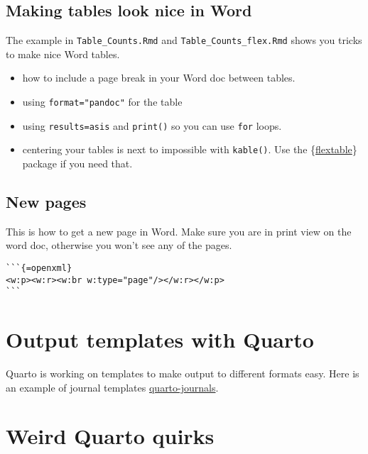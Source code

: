 \documentclass[
  letterpaper,
  oneside]{scrbook}
\providecommand{\tightlist}{%
  \setlength{\itemsep}{0pt}\setlength{\parskip}{0pt}}\usepackage{longtable,booktabs,array}
\begin{document}
\hypertarget{making-tables-look-nice-in-word}{%
\subsection{Making tables look nice in
Word}\label{making-tables-look-nice-in-word}}

The example in \texttt{Table\_Counts.Rmd} and
\texttt{Table\_Counts\_flex.Rmd} shows you tricks to make nice Word
tables.

\begin{itemize}
\tightlist
\item
  how to include a page break in your Word doc between tables.
\item
  using \texttt{format="pandoc"} for the table
\item
  using \texttt{results=\textquotesingle{}asis\textquotesingle{}} and
  \texttt{print()} so you can use \texttt{for} loops.
\item
  centering your tables is next to impossible with \texttt{kable()}. Use
  the \{\href{https://ardata-fr.github.io/flextable-book/}{flextable}\}
  package if you need that.
\end{itemize}

\hypertarget{new-pages}{%
\subsection{New pages}\label{new-pages}}

This is how to get a new page in Word. Make sure you are in print view
on the word doc, otherwise you won't see any of the pages.

\begin{verbatim}
```{=openxml}
<w:p><w:r><w:br w:type="page"/></w:r></w:p>
```
\end{verbatim}

\hypertarget{output-templates-with-quarto}{%
\section{Output templates with
Quarto}\label{output-templates-with-quarto}}

Quarto is working on templates to make output to different formats easy.
Here is an example of journal templates
\href{https://github.com/quarto-journals/}{quarto-journals}.

\hypertarget{weird-quarto-quirks}{%
\section{Weird Quarto quirks}\label{weird-quarto-quirks}}
\end{document}
